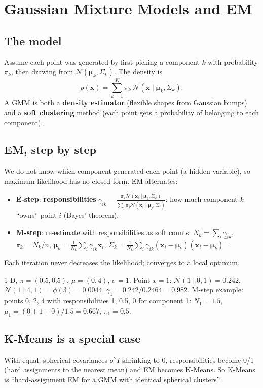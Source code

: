 \section{Gaussian Mixture Models and EM}
\subsection{The model}
Assume each point was generated by first picking a component $k$ with probability $\pi_k$, then drawing from $\mathcal N(\boldsymbol\mu_k,
\Sigma_k)$. The density is
\[ p(\mathbf x) = \sum_{k=1}^K\pi_k\,\mathcal N(\mathbf x\mid\boldsymbol\mu_k,\Sigma_k). \]
A GMM is both a \textbf{density estimator} (flexible shapes from Gaussian bumps) and a \textbf{soft clustering} method (each point gets a
probability of belonging to each component).

\subsection{EM, step by step}
We do not know which component generated each point (a hidden variable), so maximum likelihood has no closed form. EM alternates:
\begin{itemize}
\item \textbf{E-step}: \textbf{responsibilities} $\gamma_{ik} = \frac{\pi_k\mathcal N(\mathbf x_i\mid\boldsymbol\mu_k,\Sigma_k)}{\sum_j\pi_j\mathcal N(\mathbf x_i\mid\boldsymbol\mu_j,\Sigma_j)}$:
  how much component $k$ ``owns'' point $i$ (Bayes' theorem).
\item \textbf{M-step}: re-estimate with responsibilities as soft counts: $N_k = \sum_i\gamma_{ik}$, $\pi_k = N_k/n$,
  $\boldsymbol\mu_k = \frac1{N_k}\sum_i\gamma_{ik}\mathbf x_i$, $\Sigma_k = \frac1{N_k}\sum_i\gamma_{ik}(\mathbf x_i - \boldsymbol\mu_k)(\mathbf x_i - \boldsymbol\mu_k)^\top$.
\end{itemize}
Each iteration never decreases the likelihood; converges to a local optimum.

\begin{example}
1-D, $\pi = (0.5, 0.5)$, $\mu = (0, 4)$, $\sigma = 1$. Point $x = 1$: $\mathcal N(1\mid0,1) = 0.242$, $\mathcal N(1\mid4,1) = \phi(3) = 0.0044$.
$\gamma_1 = 0.242/0.2464 = 0.982$.
M-step example: points 0, 2, 4 with responsibilities 1, 0.5, 0 for component 1: $N_1 = 1.5$, $\mu_1 = (0 + 1 + 0)/1.5 = 0.667$, $\pi_1 = 0.5$.
\end{example}

\subsection{K-Means is a special case}
With equal, spherical covariances $\sigma^2I$ shrinking to 0, responsibilities become 0/1 (hard assignments to the nearest mean) and EM
becomes K-Means. So K-Means is ``hard-assignment EM for a GMM with identical spherical clusters''.

